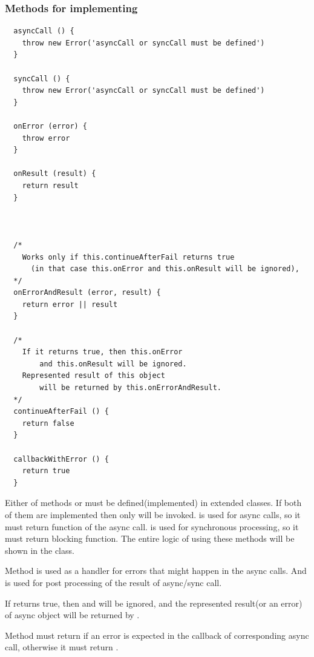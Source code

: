 \documentclass{article}
\begin{document}
\vspace*{10px}

\subsubsection{Methods for implementing}

\begin{verbatim}
  asyncCall () {
    throw new Error('asyncCall or syncCall must be defined')
  }

  syncCall () {
    throw new Error('asyncCall or syncCall must be defined')
  }

  onError (error) {
    throw error
  }

  onResult (result) {
    return result
  }



  /*
    Works only if this.continueAfterFail returns true
      (in that case this.onError and this.onResult will be ignored),
  */
  onErrorAndResult (error, result) {
    return error || result
  }

  /*
    If it returns true, then this.onError
        and this.onResult will be ignored.
    Represented result of this object
        will be returned by this.onErrorAndResult.
  */
  continueAfterFail () {
    return false
  }

  callbackWithError () {
    return true
  }
\end{verbatim}

Either of methods  or  must be defined(implemented) in extended classes. If both of them are implemented then only  will be invoked.  is used for async calls, so it must return function of the async call.  is used for synchronous processing, so it must return blocking function. The entire logic of using these methods will be shown in the  class. 

Method  is used as a handler for errors that might happen in the async calls. And  is used for post processing of the result of async/sync call.

If  returns true, then  and  will be ignored, and the represented result(or an error) of async object will be returned by .

Method  must return  if an error is expected in the callback of corresponding async call, otherwise it must return .
\end{document}
